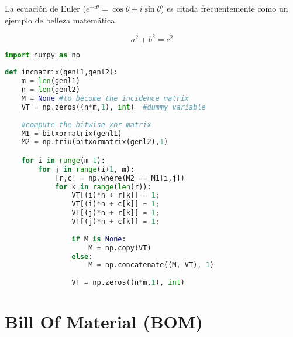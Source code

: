 La ecuación de Euler ($e^{ \pm i\theta } = \cos \theta \pm i\sin \theta$) es citada frecuentemente como un ejemplo de belleza matemática.

\begin{equation}\label{eq:pythagoras}
a^2 + b^2 = c^2
\end{equation}


\begin{lstlisting}[language=Python, caption=Python example]
import numpy as np
    
def incmatrix(genl1,genl2):
    m = len(genl1)
    n = len(genl2)
    M = None #to become the incidence matrix
    VT = np.zeros((n*m,1), int)  #dummy variable
    
    #compute the bitwise xor matrix
    M1 = bitxormatrix(genl1)
    M2 = np.triu(bitxormatrix(genl2),1) 

    for i in range(m-1):
        for j in range(i+1, m):
            [r,c] = np.where(M2 == M1[i,j])
            for k in range(len(r)):
                VT[(i)*n + r[k]] = 1;
                VT[(i)*n + c[k]] = 1;
                VT[(j)*n + r[k]] = 1;
                VT[(j)*n + c[k]] = 1;
                
                if M is None:
                    M = np.copy(VT)
                else:
                    M = np.concatenate((M, VT), 1)
                
                VT = np.zeros((n*m,1), int)
\end{lstlisting}

\lstlistoflistings

\section{Bill Of Material (BOM)\label{sec:BOM}}